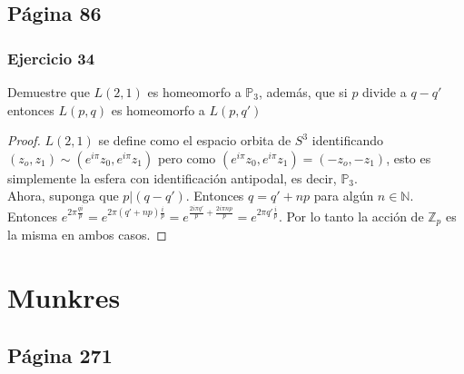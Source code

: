\documentclass[letterpaper]{article}
\begin{document}
\subsection*{P\'agina  86}
\subsubsection*{Ejercicio 34}
Demuestre que $L(2,1)$ es homeomorfo a $\mathbb{P}_3$, adem\'as, que si $p$ divide a $q-q'$ entonces $L(p,q)$ es homeomorfo a $L(p,q')$
\begin{proof}
$L(2,1)$ se define como el espacio orbita de $S^3$ identificando $(z_o,z_1)\sim (e^{i\pi}z_0,e^{i\pi}z_1)$ pero como   $(e^{i\pi}z_0,e^{i\pi}z_1)=(-z_o,-z_1)$, esto es  simplemente la esfera  con identificaci\'on antipodal, es decir, $\mathbb{P}_3$.\\
Ahora, suponga que $p|(q-q')$. Entonces $q=q'+np$ para alg\'un $n\in \mathbb{N}$. Entonces $e^{2\pi \frac{qi}{p}}=e^{2\pi(q'+np)\frac{i}{p}}= e^{\frac{2i\pi q'}{p}+\frac{2i\pi np}{p}}=e^{2\pi q'\frac{i}{p}}$. Por lo tanto la acci\'on de $\mathbb{Z}_p    $ es la misma en ambos casos.
\end{proof}
\section*{Munkres}
\subsection*{P\'agina 271}
\end{document}
